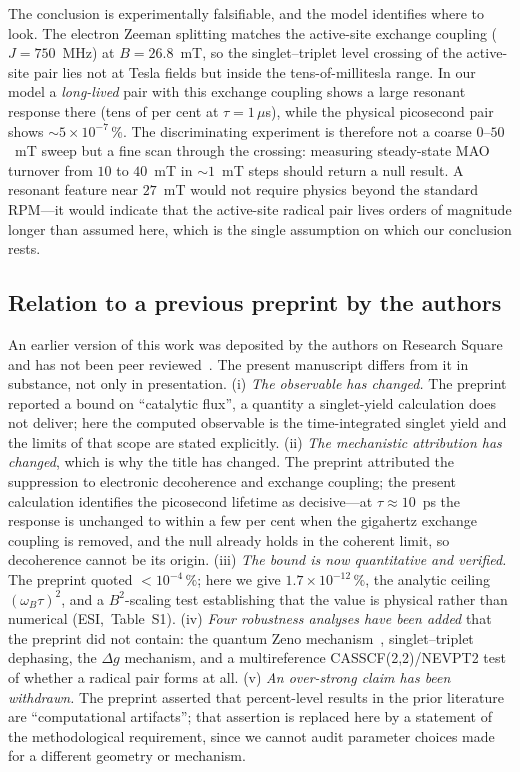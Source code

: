 \documentclass[twoside,twocolumn,9pt]{article}
\begin{document}
The conclusion is experimentally falsifiable, and the model identifies where to
look. The electron Zeeman splitting matches the active-site exchange coupling
($J = 750$~MHz) at $B = 26.8$~mT, so the singlet--triplet level crossing of the
active-site pair lies not at Tesla fields but inside the tens-of-millitesla
range. In our model a \emph{long-lived} pair with this exchange coupling shows a
large resonant response there (tens of per cent at $\tau = 1\,\mu$s), while the
physical picosecond pair shows $\sim\!5\times10^{-7}\,\%$. The discriminating
experiment is therefore not a coarse $0$--$50$~mT sweep but a fine scan through
the crossing: measuring steady-state MAO turnover from $10$ to $40$~mT in
$\sim\!1$~mT steps should return a null result. A resonant feature near $27$~mT
would not require physics beyond the standard RPM---it would indicate that the
active-site radical pair lives orders of magnitude longer than assumed here,
which is the single assumption on which our conclusion rests.

\subsection{Relation to a previous preprint by the authors}

An earlier version of this work was deposited by the authors on Research Square
and has not been peer reviewed~\cite{Wakaura2026preprint}. The present manuscript
differs from it in substance, not only in presentation. (i) \emph{The observable
has changed.} The preprint reported a bound on ``catalytic flux'', a quantity a
singlet-yield calculation does not deliver; here the computed observable is the
time-integrated singlet yield and the limits of that scope are stated explicitly.
(ii) \emph{The mechanistic attribution has changed}, which is why the title has
changed. The preprint attributed the suppression to electronic decoherence and
exchange coupling; the present calculation identifies the picosecond lifetime as
decisive---at $\tau\approx10$~ps the response is unchanged to within a few per
cent when the gigahertz exchange coupling is removed, and the null already holds
in the coherent limit, so decoherence cannot be its origin. (iii) \emph{The bound
is now quantitative and verified.} The preprint quoted $<10^{-4}\,\%$; here we
give $1.7\times10^{-12}\,\%$, the analytic ceiling $(\omega_B\tau)^2$, and a
$B^2$-scaling test establishing that the value is physical rather than numerical
(ESI,\dag~Table~S1). (iv) \emph{Four robustness analyses have been added} that
the preprint did not contain: the quantum Zeno mechanism~\cite{Denton2024},
singlet--triplet dephasing, the $\Delta g$ mechanism, and a multireference
CASSCF(2,2)/NEVPT2 test of whether a radical pair forms at all. (v) \emph{An
over-strong claim has been withdrawn.} The preprint asserted that percent-level
results in the prior literature are ``computational artifacts''; that assertion
is replaced here by a statement of the methodological requirement, since we
cannot audit parameter choices made for a different geometry or mechanism.
\end{document}
